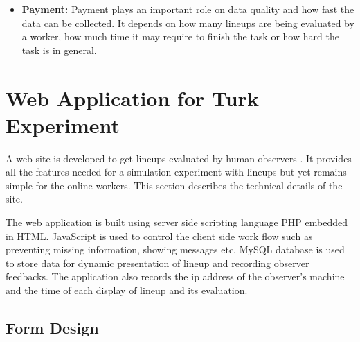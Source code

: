 \documentclass[11pt]{article}
\begin{document}
\begin{itemize}
\item {\bf Payment:} Payment plays an important role on data quality and how fast the data can be collected. It depends on how many lineups are being evaluated by a worker, how much time it may require to finish the task or how hard the task is in general.

%
%
%
%
%
%

\end{itemize}


\section{Web Application for Turk Experiment} \label{sec:web_application}

A web site is developed to get lineups evaluated by human observers \citep{majumder:turk}. It provides all the features needed for a simulation experiment with lineups but yet remains simple for the online workers. This section describes the technical details of the site. 

The web application is built using server side scripting language PHP embedded in HTML. JavaScript is used to control the client side work flow such as preventing missing information, showing messages etc. MySQL database is used to store data for dynamic presentation of lineup and recording observer feedbacks. The application also records the ip address of the observer's machine and the time of each display of lineup and its evaluation.  


\subsection{Form Design}
\end{document}
